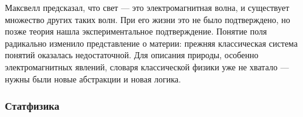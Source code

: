 Максвелл предсказал, что свет --- это электромагнитная волна, и существует множество других таких волн. При его жизни это не было подтверждено, но позже теория нашла экспериментальное подтверждение. Понятие поля радикально изменило представление о материи: прежняя классическая система понятий оказалась недостаточной. Для описания природы, особенно электромагнитных явлений, словаря классической физики уже не хватало --- нужны были новые абстракции и новая логика.

\subsubsection{Статфизика}

